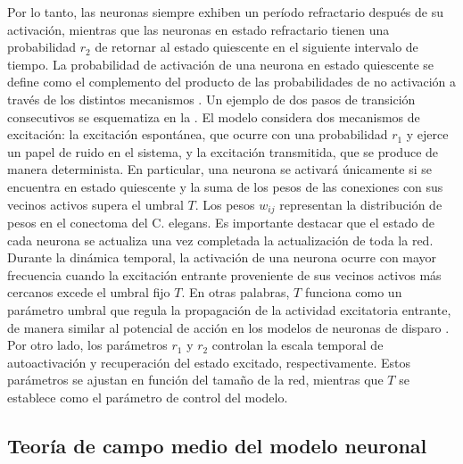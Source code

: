 Por lo tanto,  las neuronas siempre exhiben un período refractario después de su activación, mientras que las neuronas en estado refractario tienen una probabilidad $r_2$ de retornar al estado quiescente en el siguiente intervalo de tiempo. La probabilidad de activación de una neurona en estado quiescente se define como el complemento del producto de las probabilidades de no activación a través de los distintos mecanismos \cite{diaz_similar_2021}. Un ejemplo de dos pasos de transición consecutivos se esquematiza en la . El modelo considera dos mecanismos de excitación: la excitación espontánea, que ocurre con una probabilidad $r_1$ y ejerce un papel de ruido en el sistema, y la excitación transmitida, que se produce de manera determinista.  En particular, una neurona se activará únicamente si se encuentra en estado quiescente y la suma de los pesos de las conexiones con sus vecinos activos supera el umbral $T$. Los pesos $w_{ij}$ representan la distribución de pesos en el conectoma del C. elegans. Es importante destacar que el estado de cada neurona se actualiza una vez completada la actualización de toda la red.  Durante la dinámica temporal, la activación de una neurona ocurre con mayor frecuencia cuando la excitación entrante proveniente de sus vecinos activos más cercanos excede el umbral fijo $T$. En otras palabras, $T$ funciona como un parámetro umbral que regula la propagación de la actividad excitatoria entrante, de manera similar al potencial de acción en los modelos de neuronas de disparo \cite{rocha_homeostatic_2018}. Por otro lado, los parámetros $r_1$ y $r_2$ controlan la escala temporal de autoactivación y recuperación del estado excitado, respectivamente. Estos parámetros se ajustan en función del tamaño de la red, mientras que $T$ se establece como el parámetro de control del modelo.







\subsection{Teoría de campo medio del modelo neuronal}

